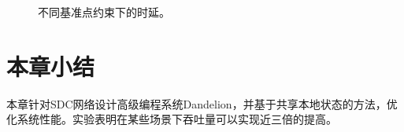 \documentclass{ctexart}
\begin{document}
\begin{figure}[!htbp]
\centering
{}
\caption{不同基准点约束下的时延。}
\label{fig:eval34}
\end{figure}


\section{本章小结}

本章针对SDC网络设计高级编程系统Dandelion，并基于共享本地状态的方法，优化系统性能。实验表明在某些场景下吞吐量可以实现近三倍的提高。





 
\end{document}

